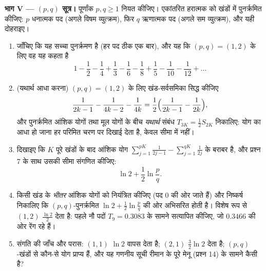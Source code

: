 \begin{problem}[{सप्ताहांत समस्या --- $H_n = \ln n + \gamma +
\frac{1}{2n} + O(n^{-2})$, और $1 - \frac12 +
\frac13 - \dots$ को पुनर्क्रमित करके $\frac{\ln 2}{2}$}]
\medskip \noindent\textbf{भाग V --- $(p, q)$ सूत्र।} पूर्णांक $p, q \geq 1$
नियत कीजिए। एकांतरित हरात्मक  को खंडों में पुनर्क्रमित कीजिए: $p$
धनात्मक पद (अगले विषम व्युत्क्रम), फिर $q$ ऋणात्मक पद (अगले सम व्युत्क्रम),
और यही दोहराइए।
\begin{enumerate}[resume]
  \item जाँचिए कि यह सच्चा पुनर्क्रमण है (हर पद ठीक एक बार), और यह कि $(p,
  q) = (1, 2)$ के लिए वह यह कहता है
        \[
        1 - \frac12 - \frac14 + \frac13 - \frac16 - \frac18 +
        \frac15 - \frac1{10} - \frac1{12} + \dots
        \]
  \item (यथार्थ आधा करना) $(p, q) = (1, 2)$ के लिए खंड-सर्वसमिका सिद्ध कीजिए
        \[
        \frac{1}{2k-1} - \frac{1}{4k-2} - \frac{1}{4k}
        = \frac12\Bigl(\frac{1}{2k-1} - \frac{1}{2k}\Bigr),
        \]
        और पुनर्क्रमित आंशिक योगों तथा मूल योगों के बीच \emph{यथार्थ} संबंध
        $T_{3K} = \frac12 S_{2K}$ निकालिए: योग का आधा हो जाना हर परिमित चरण
        पर दिखाई देता है, केवल सीमा में नहीं।
  \item दिखाइए कि $K$ पूरे खंडों के बाद आंशिक योग $\sum_{j=1}^{pK}
  \frac{1}{2j-1} - \sum_{j=1}^{qK} \frac{1}{2j}$ के बराबर है, और प्रश्न 7 के
  साथ उसकी सीमा संगणित कीजिए:
        \[
        \ln 2 + \frac12 \ln\frac pq .
        \]
  \item किसी खंड के \emph{भीतर} आंशिक योगों को नियंत्रित कीजिए (पद $0$ की ओर
  जाते हैं) और निष्कर्ष निकालिए कि $(p, q)$-पुनर्क्रमित  $\ln 2 +
  \frac12\ln \frac pq$ की ओर अभिसरित होती है। विशेष रूप से $(1, 2)$
  $\frac{\ln 2}{2}$ देता है: पहले नौ पदों $T_9 = 0.3083$ के सामने सत्यापित
  कीजिए, जो $0.3466$ की ओर रेंग रहे हैं।
  \item संगति की जाँच और परास: $(1,1)$ $\ln 2$ वापस देता है; $(2,1)$
  $\frac32\ln 2$ देता है; $(p, q)$-खंडों से कौन-से योग प्राप्य हैं, और यह
  गणनीय सूची रीमान के पूरे मेनू (प्रश्न 14) के सामने कैसी है?
\end{enumerate}


\end{problem}
